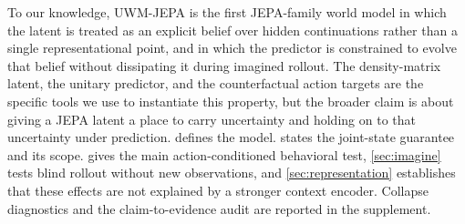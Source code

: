 To our knowledge, UWM-JEPA is the first JEPA-family world model in
which the latent is treated as an explicit belief over hidden
continuations rather than a single representational point, and in
which the predictor is constrained to evolve that belief without
dissipating it during imagined rollout. The density-matrix latent,
the unitary predictor, and the counterfactual action targets are the
specific tools we use to instantiate this property, but the broader
claim is about giving a JEPA latent a place to carry uncertainty and
holding on to that uncertainty under prediction.  defines the model.
 states the joint-state guarantee and its scope.
 gives the main action-conditioned behavioral test,
\cref{sec:imagine} tests blind rollout without new observations, and
\cref{sec:representation} establishes that these effects are not
explained by a stronger context encoder. Collapse diagnostics and the
claim-to-evidence audit are reported in the supplement.
